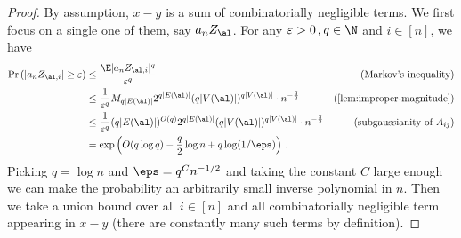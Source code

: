 \documentclass[12pt]{article}
\begin{document}
\eqinfAlmostSure*

\begin{proof}
    By assumption, $x-y$ is a sum of combinatorially negligible terms. We first focus on a single one
    of them, say $a_n Z_\al$. For any $\varepsilon>0\,, q \in \N$ and $i\in [n]$, we have
    \begin{align*}
         \Pr\left(|a_n Z_{\al,i}|\ge \varepsilon\right) &\le \frac{\E|a_n Z_{\al,i}|^q} {\varepsilon^q}
         &\text{(Markov's inequality)}\\
         &\le \frac 1 {\varepsilon^q} M_{q|E(\al)|}2^{q|E(\al)|}(q|V(\al)|)^{q|V(\al)|} \cdot n^{-\frac q2}
         &\text{(\cref{lem:improper-magnitude})}\\
         &\le \frac 1 {\varepsilon^q}  (q|E(\al)|)^{O(q)} 2^{q|E(\al)|}(q|V(\al)|)^{q|V(\al)|} \cdot n^{-\frac q2} & (\text{subgaussianity of $A_{ij}$})\\
         &= \exp\left(O(q\log q) - \frac q 2 \log n + q\log (1/\eps)\right)\,.
     \end{align*}
     Picking $q=\log n$ and $\eps=q^C n^{-1/2}$
     and taking the constant $C$ large enough we
     can make the probability an arbitrarily
     small inverse polynomial in $n$. Then we
     take a union bound over all 
     $i\in [n]$ and all combinatorially negligible term appearing in $x-y$ (there are constantly many such terms by definition).
\end{proof}
\end{document}
